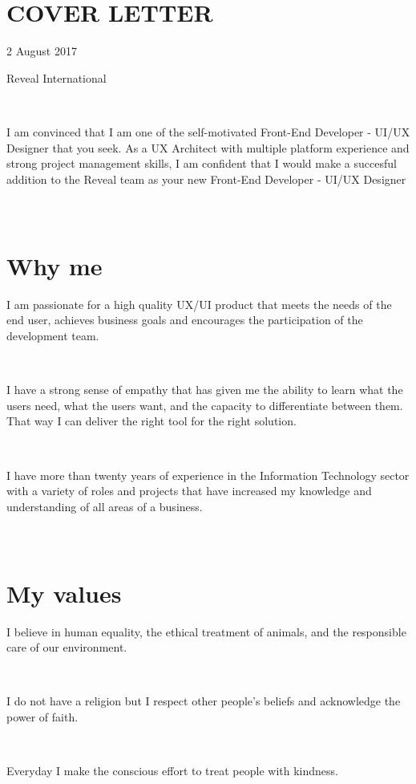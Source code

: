 \documentclass{resume}
\begin{document}



\section{\\ COVER LETTER}
  \role{}{}
  2 August 2017\par
 Reveal International\par
  ~\par
  I am convinced that I am one of the self-motivated Front-End Developer - UI/UX Designer that you seek. As a UX Architect with multiple platform experience and strong project management skills, I am confident that I would make a succesful addition to the Reveal team as your new Front-End Developer - UI/UX Designer
  \par

\section{\\ Why me}
  \role{}{}
  I am passionate for a high quality UX/UI product that meets the needs of the end user, achieves business goals and encourages the participation of the development team.\par
  ~\par
  I have a strong sense of empathy that has given me the ability to learn what the users need, what the users want, and the capacity to differentiate between them. That way I can deliver the right tool for the right solution.\par
  ~\par
  I have more than twenty years of experience in the Information Technology sector with a variety of roles and projects that have increased my knowledge and understanding of all areas of a business.\par

\section{\\ My values}
  \role{}{}
  I believe in human equality, the ethical treatment of animals, and the responsible care of our environment.\par
  ~\par
  I do not have a religion but I respect other people's beliefs and acknowledge the power of faith.\par
  ~\par
  Everyday I make the conscious effort to treat people with kindness.\par
\end{document}
